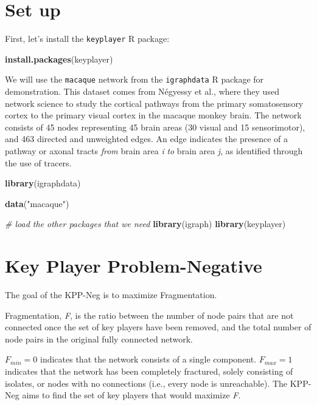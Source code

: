 \documentclass[
]{book}
\newenvironment{Shaded}{\begin{snugshade}}{\end{snugshade}}
\newcommand{\CommentTok}[1]{\textcolor[rgb]{0.56,0.35,0.01}{\textit{#1}}}
\newcommand{\FunctionTok}[1]{\textcolor[rgb]{0.13,0.29,0.53}{\textbf{#1}}}
\newcommand{\NormalTok}[1]{#1}
\newcommand{\StringTok}[1]{\textcolor[rgb]{0.31,0.60,0.02}{#1}}
\begin{document}
\section{Set up}\label{set-up-1}

First, let's install the \texttt{keyplayer} R package:

\begin{Shaded}
\begin{Highlighting}[]
\FunctionTok{install.packages}\NormalTok{(}\StringTok{\textquotesingle{}keyplayer\textquotesingle{}}\NormalTok{)}
\end{Highlighting}
\end{Shaded}

We will use the \texttt{macaque} network from the \texttt{igraphdata} R package for demonstration. This dataset comes from Négyessy et al., where they used network science to study the cortical pathways from the primary somatosensory cortex to the primary visual cortex in the macaque monkey brain. The network consists of 45 nodes representing 45 brain areas (30 visual and 15 sensorimotor), and 463 directed and unweighted edges. An edge indicates the presence of a pathway or axonal tracts \emph{from} brain area \emph{i} \emph{to} brain area \emph{j}, as identified through the use of tracers.

\begin{Shaded}
\begin{Highlighting}[]
\FunctionTok{library}\NormalTok{(igraphdata)}

\FunctionTok{data}\NormalTok{(}\StringTok{"macaque"}\NormalTok{)}

\CommentTok{\# load the other packages that we need }
\FunctionTok{library}\NormalTok{(igraph)}
\FunctionTok{library}\NormalTok{(keyplayer)}
\end{Highlighting}
\end{Shaded}

\section{Key Player Problem-Negative}\label{key-player-problem-negative}

The goal of the KPP-Neg is to maximize Fragmentation.

Fragmentation, \emph{F}, is the ratio between the number of node pairs that are not connected once the set of key players have been removed, and the total number of node pairs in the original fully connected network.

\(F_{min} = 0\) indicates that the network consists of a single component. \(F_{max} = 1\) indicates that the network has been completely fractured, solely consisting of isolates, or nodes with no connections (i.e., every node is unreachable). The KPP-Neg aims to find the set of key players that would maximize \emph{F}.
\end{document}
